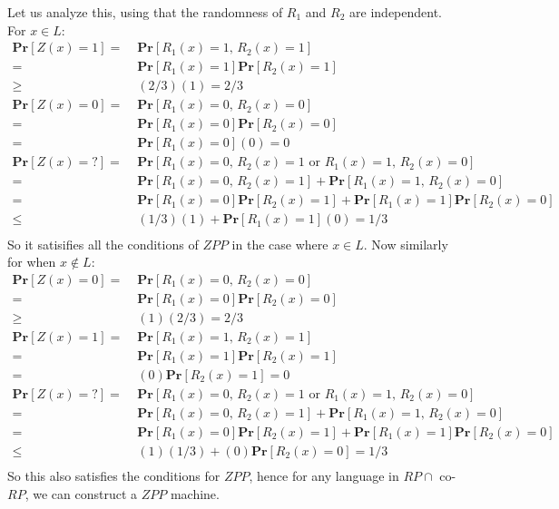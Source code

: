 \documentclass[english]{article}
\begin{document}
Let us analyze this, using that the randomness of $R_1$ and $R_2$ are independent. For $x \in L$:
\begin{align*}
\mathbf{Pr}[Z(x) = 1]
  =&\; \mathbf{Pr}[R_1(x) = 1,\, R_2(x) = 1] \\
  =&\; \mathbf{Pr}[R_1(x) = 1] \mathbf{Pr}[R_2(x) = 1] \\
  \ge&\; (2/3)(1) = 2/3 \\
\mathbf{Pr}[Z(x) = 0]
  =&\; \mathbf{Pr}[R_1(x) = 0,\, R_2(x) = 0] \\
  =&\; \mathbf{Pr}[R_1(x) = 0] \mathbf{Pr}[R_2(x) = 0] \\
  =&\; \mathbf{Pr}[R_1(x) = 0](0) = 0 \\
\mathbf{Pr}[Z(x) = ?]
  =&\; \mathbf{Pr}[R_1(x) = 0,\, R_2(x) = 1 \textrm{ or } R_1(x) = 1,\, R_2(x) = 0] \\
  =&\; \mathbf{Pr}[R_1(x) = 0,\, R_2(x) = 1] + \mathbf{Pr}[R_1(x) = 1,\, R_2(x) = 0] \\
  =&\; \mathbf{Pr}[R_1(x) = 0]\mathbf{Pr}[R_2(x) = 1] + \mathbf{Pr}[R_1(x) = 1]\mathbf{Pr}[R_2(x) = 0] \\
  \le&\; (1/3)(1) + \mathbf{Pr}[R_1(x) = 1](0) = 1/3 \\
\end{align*}
So it satisifies all the conditions of $ZPP$ in the case where $x \in L$. Now similarly for when $x \notin L$:
\begin{align*}
\mathbf{Pr}[Z(x) = 0]
  =&\; \mathbf{Pr}[R_1(x) = 0,\, R_2(x) = 0] \\
  =&\; \mathbf{Pr}[R_1(x) = 0] \mathbf{Pr}[R_2(x) = 0] \\
  \ge&\; (1)(2/3) = 2/3 \\
\mathbf{Pr}[Z(x) = 1]
  =&\; \mathbf{Pr}[R_1(x) = 1,\, R_2(x) = 1] \\
  =&\; \mathbf{Pr}[R_1(x) = 1] \mathbf{Pr}[R_2(x) = 1] \\
  =&\; (0)\mathbf{Pr}[R_2(x) = 1] = 0 \\
\mathbf{Pr}[Z(x) = ?]
  =&\; \mathbf{Pr}[R_1(x) = 0,\, R_2(x) = 1 \textrm{ or } R_1(x) = 1,\, R_2(x) = 0] \\
  =&\; \mathbf{Pr}[R_1(x) = 0,\, R_2(x) = 1] + \mathbf{Pr}[R_1(x) = 1,\, R_2(x) = 0] \\
  =&\; \mathbf{Pr}[R_1(x) = 0]\mathbf{Pr}[R_2(x) = 1] + \mathbf{Pr}[R_1(x) = 1]\mathbf{Pr}[R_2(x) = 0] \\
  \le&\; (1)(1/3) + (0)\mathbf{Pr}[R_2(x) = 0] = 1/3 \\
\end{align*}
So this also satisfies the conditions for $ZPP$, hence for any language in $RP \cap$ co-$RP$, we can construct a
$ZPP$ machine. 
\end{document}
